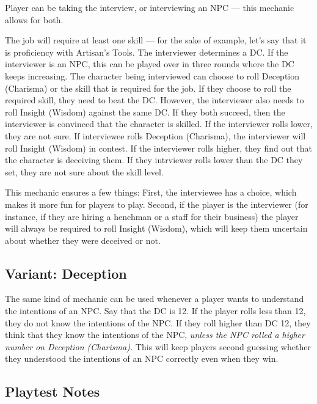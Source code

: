 \documentclass[twocolumn]{dndbook}
\begin{document}
Player can be taking the interview, or interviewing an NPC --- this mechanic allows for both.\par

The job will require at least one skill --- for the sake of example, let's say that it is proficiency with Artisan's Tools.
The interviewer determines a DC. If the interviewer is an NPC, this can be played over in three rounds where the DC keeps increasing.
The character being interviewed can choose to roll Deception (Charisma) or the skill that is required for the job.
If they choose to roll the required skill, they need to beat the DC. However, the interviewer also needs to roll Insight (Wisdom) against the same DC.
If they both succeed, then the interviewer is convinced that the character is skilled.
If the interviewer rolls lower, they are not sure.
If interviewee rolls Deception (Charisma), the interviewer will roll Insight (Wisdom) in contest.
If the interviewer rolls higher, they find out that the character is deceiving them.
If they intrviewer rolls lower than the DC they set, they are not sure about the skill level.\par

This mechanic ensures a few things: First, the interviewee has a choice, which makes it more fun for players to play.
Second, if the player is the interviewer (for instance, if they are hiring a henchman or a staff for their business)
the player will always be required to roll Insight (Wisdom), which will keep them uncertain about whether they were deceived or not.\par

\subsection{Variant: Deception}

The same kind of mechanic can be used whenever a player wants to understand the intentions of an NPC.
Say that the DC is 12. If the player rolls less than 12, they do not know the intentions of the NPC.
If they roll higher than DC 12, they think that they know the intentions of the NPC, \emph{unless the NPC rolled a higher number on Deception (Charisma).}
This will keep players second guessing whether they understood the intentions of an NPC correctly even when they win.\par

\subsection{Playtest Notes}
\end{document}
